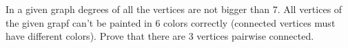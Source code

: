 \problem{}
In a given graph degrees of all the vertices are not bigger than 7.
All vertices of the given grapf can't be painted in 6 colors correctly
(connected vertices must have different colors).
Prove that there are 3 vertices pairwise connected.

\solution

\endproblem
